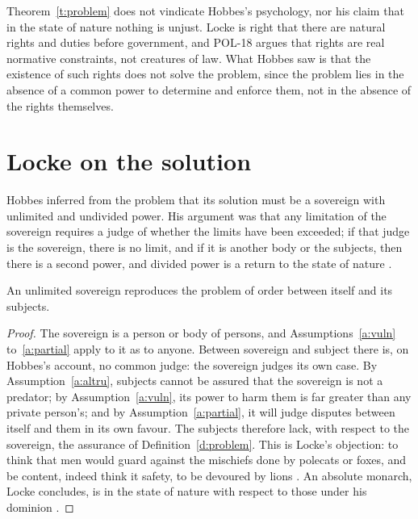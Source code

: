 \documentclass{situationist-preprint}
\begin{document}
Theorem~\ref{t:problem} does not vindicate Hobbes's psychology, nor his claim that in the state of nature nothing is unjust. Locke is right that there are natural rights and duties before government, and POL-18 argues that rights are real normative constraints, not creatures of law. What Hobbes saw is that the existence of such rights does not solve the problem, since the problem lies in the absence of a common power to determine and enforce them, not in the absence of the rights themselves.

\section{Locke on the solution}

Hobbes inferred from the problem that its solution must be a sovereign with unlimited and undivided power. His argument was that any limitation of the sovereign requires a judge of whether the limits have been exceeded; if that judge is the sovereign, there is no limit, and if it is another body or the subjects, then there is a second power, and divided power is a return to the state of nature \citep[chs.~18, 29]{Hobbes1651}.

\begin{lemma}[Reproduction]\label{l:repro}
An unlimited sovereign reproduces the problem of order between itself and its subjects.
\end{lemma}

\begin{proof}
The sovereign is a person or body of persons, and Assumptions~\ref{a:vuln} to~\ref{a:partial} apply to it as to anyone. Between sovereign and subject there is, on Hobbes's account, no common judge: the sovereign judges its own case. By Assumption~\ref{a:altru}, subjects cannot be assured that the sovereign is not a predator; by Assumption~\ref{a:vuln}, its power to harm them is far greater than any private person's; and by Assumption~\ref{a:partial}, it will judge disputes between itself and them in its own favour. The subjects therefore lack, with respect to the sovereign, the assurance of Definition~\ref{d:problem}. This is Locke's objection: to think that men would guard against the mischiefs done by polecats or foxes, and be content, indeed think it safety, to be devoured by lions \citep[\S 93]{Locke1689}. An absolute monarch, Locke concludes, is in the state of nature with respect to those under his dominion \citep[\S\S 90--91]{Locke1689}.
\end{proof}
\end{document}
